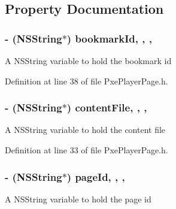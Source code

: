 \subsection{Property Documentation}
\hypertarget{interface_pxe_player_page_abc45c16daa18448f6b62f8659b2b40a8}{
\subsubsection[{bookmark\-Id}]{\setlength{\rightskip}{0pt plus 5cm}-\/ (N\-S\-String$\ast$) bookmark\-Id\hspace{0.3cm}{\ttfamily [read]}, {\ttfamily [write]}, {\ttfamily [nonatomic]}, {\ttfamily [strong]}}}\label{interface_pxe_player_page_abc45c16daa18448f6b62f8659b2b40a8}
A N\-S\-String variable to hold the bookmark id 

Definition at line 38 of file Pxe\-Player\-Page.\-h.

\hypertarget{interface_pxe_player_page_acfcb40c67266260146efccbbfdcccab5}{
\subsubsection[{content\-File}]{\setlength{\rightskip}{0pt plus 5cm}-\/ (N\-S\-String$\ast$) content\-File\hspace{0.3cm}{\ttfamily [read]}, {\ttfamily [write]}, {\ttfamily [nonatomic]}, {\ttfamily [strong]}}}\label{interface_pxe_player_page_acfcb40c67266260146efccbbfdcccab5}
A N\-S\-String variable to hold the content file 

Definition at line 33 of file Pxe\-Player\-Page.\-h.

\hypertarget{interface_pxe_player_page_a307e00301005f6a1c6efdd92e8b017d7}{
\subsubsection[{page\-Id}]{\setlength{\rightskip}{0pt plus 5cm}-\/ (N\-S\-String$\ast$) page\-Id\hspace{0.3cm}{\ttfamily [read]}, {\ttfamily [write]}, {\ttfamily [nonatomic]}, {\ttfamily [strong]}}}\label{interface_pxe_player_page_a307e00301005f6a1c6efdd92e8b017d7}
A N\-S\-String variable to hold the page id 

